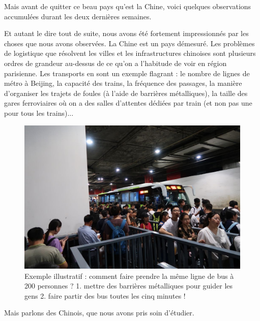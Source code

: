 Mais avant de quitter ce beau pays qu'est la Chine, voici quelques
observations accumulées durant les deux dernières semaines.

Et autant le dire tout de suite, nous avons été fortement impressionnés
par les choses que nous avons observées. La Chine est un pays démesuré.
Les problèmes de logistique que résolvent les villes et les
infrastructures chinoises sont plusieurs ordres de grandeur au-dessus de
ce qu'on a l'habitude de voir en région parisienne. Les transports en
sont un exemple flagrant : le nombre de lignes de métro à Beijing, la
capacité des trains, la fréquence des passages, la manière d'organiser
les trajets de foules (à l'aide de barrières métalliques), la taille des
gares ferroviaires où on a des salles d'attentes dédiées par train (et
non pas une pour tous les trains)...

\begin{figure}
\centering
\includegraphics{images/20180622_bus.JPG}
\caption{Exemple illustratif : comment faire prendre la même ligne de
bus à 200 personnes ? 1. mettre des barrières métalliques pour guider
les gens 2. faire partir des bus toutes les cinq minutes !}
\end{figure}

Mais parlons des Chinois, que nous avons pris soin d'étudier.

